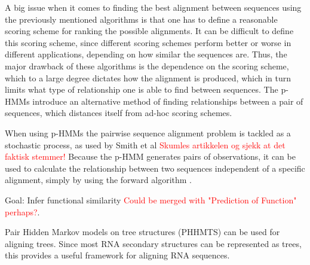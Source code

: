\documentclass{article}
\begin{document}
A big issue when it comes to finding the best alignment between sequences using the previously mentioned algorithms is that one has to define a reasonable scoring scheme for ranking the possible alignments. It can be difficult to define this scoring scheme, since different scoring schemes perform better or worse in different applications, depending on how similar the sequences are. Thus, the major drawback of these algorithms is the dependence on the scoring scheme, which to a large degree dictates how the alignment is produced, which in turn limits what type of relationship one is able to find between sequences. The p-HMMs introduce an alternative method of finding relationships between a pair of sequences, which distances itself from ad-hoc scoring schemes. 

When using p-HMMs the pairwise sequence alignment problem is tackled as a stochastic process, as used by Smith et al \cite{Smith2003} \textcolor{red}{Skumles artikkelen og sjekk at det faktisk stemmer!} Because the p-HMM generates pairs of observations, it can be used to calculate the relationship between two sequences independent of a specific alignment, simply by using the forward algorithm \cite{Choo2004}.

Goal: Infer functional similarity \textcolor{red}{Could be merged with "Prediction of Function" perhaps?}.

Pair Hidden Markov models on tree structures (PHHMTS) can be used for aligning trees. Since most RNA secondary structures can be represented as trees, this provides a useful framework for aligning RNA sequences. 
\end{document}
